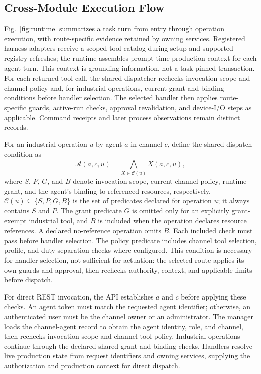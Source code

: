\subsection{Cross-Module Execution Flow}
\label{sec:executionflow}
Fig.~\ref{fig:runtime} summarizes a task turn from entry through operation
execution, with route-specific evidence retained by owning services. Registered
harness adapters receive a scoped tool catalog during setup and supported
registry refreshes; the runtime assembles prompt-time production context for
each agent turn. This context is grounding information, not a task-pinned
transaction. For each returned tool call, the shared dispatcher rechecks
invocation scope and channel policy and, for industrial operations, current
grant and binding conditions before handler selection. The selected handler
then applies route-specific guards, active-run checks, approval
revalidation, and device-I/O steps as applicable. Command receipts and later
process observations remain distinct records.

For an industrial operation $u$ by agent $a$ in channel $c$, define the
shared dispatch condition as
\begin{equation}
\mathcal{A}(a,c,u)=\bigwedge_{X\in\mathcal{C}(u)}X(a,c,u),
\label{eq:dispatch-contract}
\end{equation}
where $S$, $P$, $G$, and $B$ denote invocation scope, current channel policy,
runtime grant, and the agent's binding to referenced resources, respectively.
$\mathcal{C}(u)\subseteq\{S,P,G,B\}$ is the set of predicates declared for
operation $u$; it always contains $S$ and $P$. The grant predicate $G$ is
omitted only for an explicitly grant-exempt industrial tool, and $B$ is
included when the operation declares resource references. A declared
no-reference operation omits $B$. Each included check must pass before
handler selection. The policy predicate includes channel tool selection,
profile, and duty-separation checks where configured. This condition is
necessary for handler selection, not sufficient for actuation: the selected
route applies its own guards and approval, then rechecks authority, context,
and applicable limits before dispatch.

For direct REST invocation, the API establishes $a$ and $c$ before applying
these checks. An agent token must match the requested agent identifier;
otherwise, an authenticated user must be the channel owner or an administrator.
The manager loads the channel-agent record to obtain the agent identity,
role, and channel, then rechecks invocation scope and channel tool policy.
Industrial operations continue through the declared shared grant and binding
checks.
Handlers resolve live production state from request identifiers and owning
services, supplying the authorization and production context for direct dispatch.

